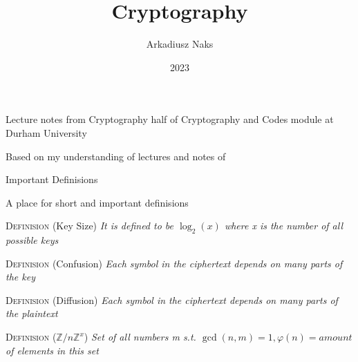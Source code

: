 \documentclass[12pt, letterpaper]{article}
\title{Cryptography}
\author{Arkadiusz Naks}
\date{2023}
\begin{document}
\begin{titlepage}
  \begin{center}
    \makeatletter
    \vspace*{1cm}
    \Huge
    \textbf{\@title}

    \vspace{0.5cm}
    \Large
    Lecture notes from Cryptography half of Cryptography and Codes module at Durham University

    \vspace{1.5cm}

    \textbf{\@author}

    \vfill

    \vspace{0.8cm}

    \small
    Based on my understanding of lectures and notes of \\
    \@date{}
  \end{center}
\end{titlepage}

\tableofcontents
\newpage

\begin{section}{Important Definisions}

  A place for short and important definisions

  \textsc{Definision} (Key Size) \textit{It is defined to be \(\log_{2}(x)\)
    where x is the number of all possible keys}

  \textsc{Definision} (Confusion) \textit{Each symbol in the ciphertext depends
    on many parts of the key}

  \textsc{Definision} (Diffusion) \textit{Each symbol in the ciphertext depends
    on many parts of the plaintext}

  \textsc{Definision} (\(\mathbb{Z}/n \mathbb{Z}^{x}\)) \textit{Set of all
    numbers m s.t. \(\gcd(n, m) = 1, \varphi(n) = amount\) of elements in this
    set}

\end{section}
\end{document}
